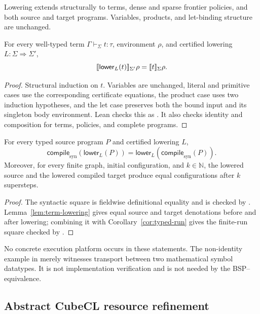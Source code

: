 Lowering extends structurally to terms, dense and sparse frontier policies,
and both source and target programs.  Variables, products, and let-binding
structure are unchanged.

\begin{lemma}
\label{lem:term-lowering}
For every well-typed term $\Gamma\vdash_\Sigma t:\tau$, environment $\rho$,
and certified lowering $L:\Sigma\Rightarrow\Sigma'$,
\[
 \lbrack\!\lbrack \mathsf{lower}_L(t) \rbrack\!\rbrack_{\Sigma'}\rho
 =\lbrack\!\lbrack t \rbrack\!\rbrack_\Sigma\rho.
\]
\end{lemma}

\begin{proof}
Structural induction on $t$.  Variables are unchanged, literal and primitive
cases use the corresponding certificate equations, the product case uses two
induction hypotheses, and the let case preserves both the bound input and its
singleton body environment.  Lean checks this as
.  It also checks identity and composition for
terms, policies, and complete programs.
\end{proof}

\begin{theorem}
\label{thm:lowering-naturality}
For every typed source program $P$ and certified lowering $L$,
\[
 \mathsf{compile}_{\mathrm{syn}}(\mathsf{lower}_L(P))
 =\mathsf{lower}_L(\mathsf{compile}_{\mathrm{syn}}(P)).
\]
Moreover, for every finite graph, initial configuration, and
$k\in\mathbb{N}$, the lowered source and the lowered compiled target produce
equal configurations after $k$ supersteps.
\end{theorem}

\begin{proof}
The syntactic square is fieldwise definitional equality and is checked by
.  Lemma~\ref{lem:term-lowering} gives equal source
and target denotations before and after lowering; combining it with
Corollary~\ref{cor:typed-run} gives the finite-run square checked by
.
\end{proof}

No concrete execution platform occurs in these statements.  The non-identity
example in  merely witnesses transport
between two mathematical symbol datatypes.  It is not implementation
verification and is not needed by the BSP--\TA{} equivalence.

\subsection{Abstract CubeCL resource refinement}


